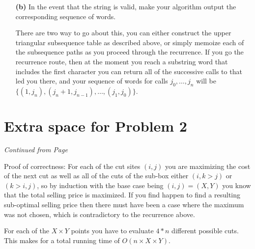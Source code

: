 \documentclass[11pt]{article}
\begin{document}
\begin{itemize}
\item[{\bf (b)}] In the event that the string is valid, make your algorithm output the corresponding sequence of words.

There are two way to go about this, you can either construct the upper triangular subsequence table as described above, or 
simply memoize each of the subsequence paths as you proceed through the recurrence.  If you go the recurrence route, 
then at the moment you reach a substring word that includes the first character you can return all of the successive calls to 
 that led you there, and your sequence of words for calls $j_0,\ldots,j_n$ will be $\{(1,j_n),(j_n+1,j_{n-1}),\ldots,(j_1,j_0)\}$.
 

\end{itemize} 
 
 
 \newpage
 
 
 \section*{Extra space for Problem 2}
 \emph{Continued from Page \pageref{pg:end-of-p2}}
  

Proof of correctness: For each of the cut sites $(i,j)$ you are maximizing the cost of the next cut as well as all of the cuts of the sub-box
either $(i,k>j)$ or $(k>i,j)$, so by induction with the base case being $(i,j)=(X,Y)$ you know that the total selling price is maximized. 
If you find happen to find a resulting sub-optimal selling price then there must have been a case where the maximum was not chosen, which is contradictory
to the recurrence above. 

For each of the $X \times Y$ points you have to evaluate $4*n$ different possible cuts. This makes for a total running time of $O(n\times X \times Y)$.%
 
\end{document}
